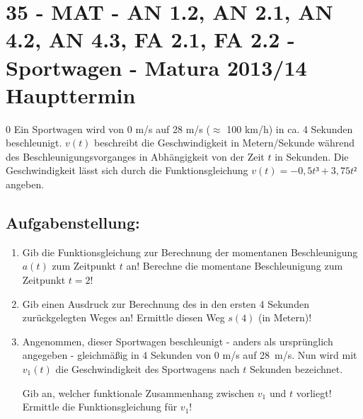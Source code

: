 \section{35 - MAT - AN 1.2, AN 2.1, AN 4.2, AN 4.3, FA 2.1, FA 2.2 - Sportwagen - Matura 2013/14 Haupttermin}

\begin{langesbeispiel} \item[0] %
				Ein Sportwagen wird von 0 m/s auf 28 m/s ($\approx$ 100 km/h) in ca. 4 Sekunden beschleunigt. $v(t)$ beschreibt die Geschwindigkeit in Metern/Sekunde während des Beschleunigungsvorganges in Abhängigkeit von der Zeit $t$ in Sekunden. Die Geschwindigkeit lässt sich durch die Funktionsgleichung $v(t)=-0,5t³+3,75t²$ angeben.

\subsection{Aufgabenstellung:}
\begin{enumerate}
	\item {}  Gib die Funktionsgleichung zur Berechnung der momentanen Beschleunigung $a(t)$ zum Zeitpunkt $t$ an!  Berechne die momentane Beschleunigung zum Zeitpunkt $t=2$!
	
	\item  Gib einen Ausdruck zur Berechnung des in den ersten 4 Sekunden zurückgelegten Weges an! Ermittle diesen Weg $s(4)$ (in Metern)!
	
	\item  Angenommen, dieser Sportwagen beschleunigt - anders als ursprünglich angegeben - gleichmäßig in 4 Sekunden von 0 m/s auf 28 m/s. Nun wird mit $v_1(t)$ die Geschwindigkeit des Sportwagens nach $t$ Sekunden bezeichnet.
	
	Gib an, welcher funktionale Zusammenhang zwischen $v_1$ und $t$ vorliegt! Ermittle die Funktionsgleichung für $v_1$!
						\end{enumerate}\leer
				
\end{langesbeispiel}
